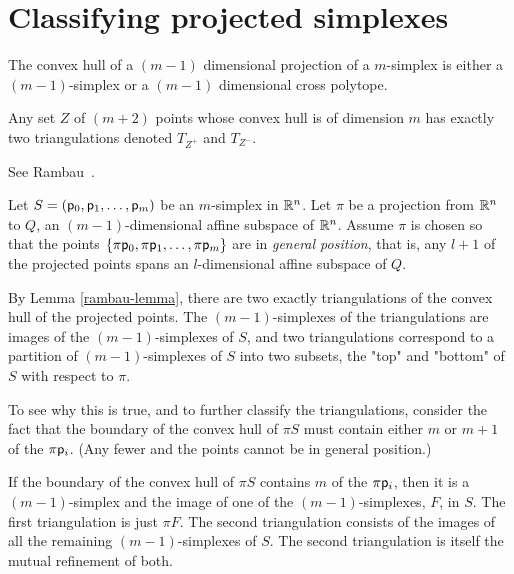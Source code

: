 
\section{Classifying projected simplexes}
\label{sec:classifying}


The convex hull of a $(m-1)$ dimensional projection of a $m$-simplex
is either a $(m-1)$-simplex or a $(m-1)$ dimensional cross polytope.

\begin{Lemma}
\label{rambau-lemma}
Any set $Z$ of $(m+2)$ points whose convex hull is of dimension $m$
has exactly two triangulations denoted $T_{Z^+}$ and $T_{Z^-}$.
\end{Lemma}

See Rambau~\cite[Lemma~1.1.2]{Rambau:1996:PolytopeProjection}.

Let $S=(\mathsf{p}_0, \mathsf{p}_1, \ldots , \mathsf{p}_m)$ be an $m$-simplex in $\mathbb{R}^{n}$.
Let $\pi$ be a projection from $\mathbb{R}^{n}$ to $Q$, an $(m-1)$-dimensional
affine subspace of $\mathbb{R}^{n}$.
Assume $\pi$ is chosen so that the points
$\{\pi \mathsf{p}_0, \pi \mathsf{p}_1, \ldots , \pi \mathsf{p}_m\}$ are in {\it general position},
that is, any $l+1$ of the projected points spans an $l$-dimensional
affine subspace of $Q$.

By Lemma \ref{rambau-lemma},
there are two exactly triangulations of the convex hull of the projected points.
The $(m-1)$-simplexes of the triangulations are images of the $(m-1)$-simplexes of $S$,
and two triangulations correspond to a partition of $(m-1)$-simplexes of $S$
into two subsets, the "top" and "bottom" of $S$ with respect to $\pi$.

To see why this is true, and to further classify the triangulations,
consider the fact that the boundary of the convex hull of $\pi S$
must contain either $m$ or $m+1$ of the $\pi \mathsf{p}_i$.
(Any fewer and the points cannot be in general position.)

\begin{Theorem}
\label{one-simplex-case}
If the boundary of the convex hull of $\pi S$
contains $m$ of the $\pi \mathsf{p}_i$,
then it is a $(m-1)$-simplex
and the image of one of the $(m-1)$-simplexes, $F$, in $S$.
The first triangulation is just $\pi F$.
The second triangulation consists of the images of
all the remaining $(m-1)$-simplexes of $S$.
The second triangulation is itself the mutual refinement of both.
\end{Theorem}

